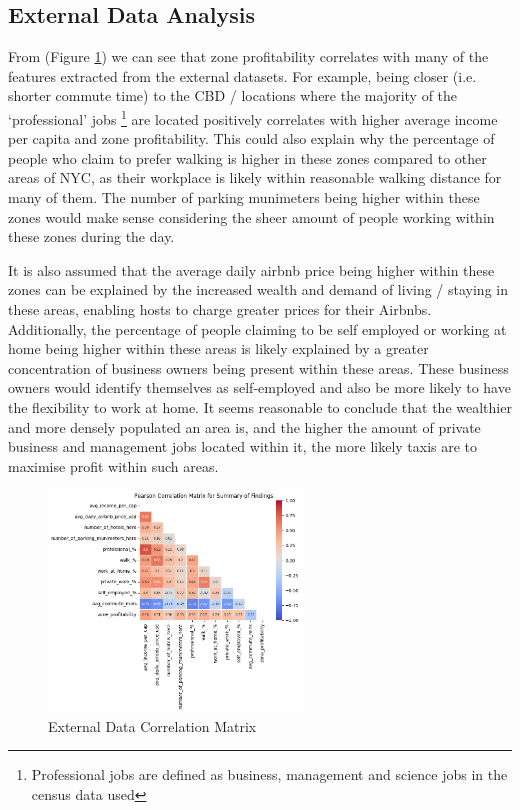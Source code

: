\documentclass[11pt]{article}
\begin{document}
\subsection{External Data Analysis}
From (Figure \ref{2}) we can see that zone profitability correlates with many of the features extracted from the external datasets. For example, being closer (i.e. shorter commute time) to the CBD / locations where the majority of the `professional' jobs \footnote{Professional jobs are defined as business, management and science jobs in the census data used} are located positively correlates with higher average income per capita and zone profitability. This could also explain why the percentage of people who claim to prefer walking is higher in these zones compared to other areas of NYC, as their workplace is likely within reasonable walking distance for many of them.  The number of parking munimeters being higher within these zones would make sense considering the sheer amount of people working within these zones during the day. 

It is also assumed that the average daily airbnb price being higher within these zones can be explained by the increased wealth and demand of living / staying in these areas, enabling hosts to charge greater prices for their Airbnbs. Additionally, the percentage of people claiming to be self employed or working at home being higher within these areas is likely explained by a greater concentration of business owners being present within these areas. These business owners would identify themselves as self-employed and also be more likely to have the flexibility to work at home. It seems reasonable to conclude that the wealthier and more densely populated an area is, and the higher the amount of private business and management jobs located within it, the more likely taxis are to maximise profit within such areas.

\begin{figure}
    \centering
    \vspace{-70pt}
    \includegraphics[width=0.6\textwidth]{plots/correlation.png}

    \caption{External Data Correlation Matrix}
    \vskip -35pt 
    \label{2}
\end{figure}
\end{document}
